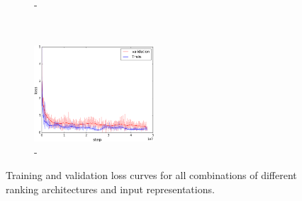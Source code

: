 \begin{figure}[t]
\begin{subfigure}[t]{0.33\textwidth}
        \caption{\label{fig:m3f2}\mthree-\ftwo}
    \end{subfigure}%
    ~
    \begin{subfigure}[t]{0.33\textwidth}
        \centering
        \includegraphics[height=3.6cm]{03-part-02/chapter-04/figs_and_tables/loss_step_plots/step_m3f3.png}
        \caption{\label{fig:m3f3}\mthree-\fthree}
    \end{subfigure}%
    \caption{Training and validation loss curves for all combinations of different ranking architectures and input representations.}
    \label{fig:step-loss}
\end{figure}
